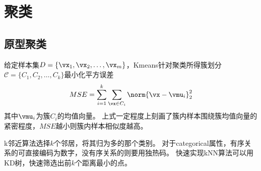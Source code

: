 
\section{聚类}
\subsection{原型聚类}
给定样本集$D=\{\vx_1,\vx_2,\ldots,\vx_m\}$，Kmeans针对聚类所得簇划分$\mathcal{C}=\{C_1,C_2,\ldots,C_k\}$最小化平方误差
\[MSE=\sum_{i=1}^k\sum_{\vx\in C_i}\norm{\vx-\vmu_i}_2^2\]
其中$\vmu_i$为簇$C_i$的均值向量。
上式一定程度上刻画了簇内样本围绕簇均值向量的紧密程度，$MSE$越小则簇内样本相似度越高。

k邻近算法选择$k$个邻居，将其归为多的那个类别。
对于categorical属性，有序关系的可直接编码为数字，没有序关系的则要用独热码。
快速实现kNN算法可以用KD树，快速筛选出前$k$个距离最小的点。